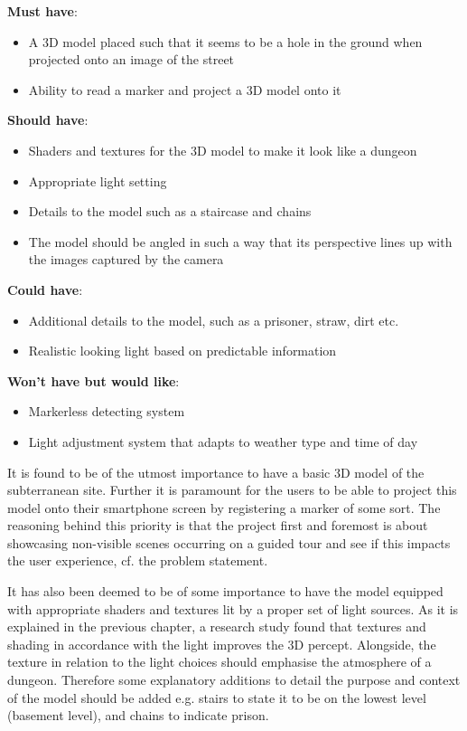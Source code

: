 \textbf{Must have}:
\begin{itemize}
\item A 3D model placed such that it seems to be a hole in the ground when projected onto an image of the street
\item Ability to read a marker and project a 3D model onto it
\end{itemize}

\textbf{Should have}:
\begin{itemize}
\item Shaders and textures for the 3D model to make it look like a dungeon
\item Appropriate light setting
\item Details to the model such as a staircase and chains
\item The model should be angled in such a way that its perspective lines up with the images captured by the camera
\end{itemize}

\textbf{Could have}:
\begin{itemize}
\item Additional details to the model, such as a prisoner, straw, dirt etc.
\item Realistic looking light based on predictable information
\end{itemize}

\textbf{Won’t have but would like}:
\begin{itemize}
\item Markerless detecting system
\item Light adjustment system that adapts to weather type and time of day
\end{itemize}

It is found to be of the utmost importance to have a basic 3D model of the subterranean site. Further it is paramount for the users to be able to project this model onto their smartphone screen by registering a marker of some sort. The reasoning behind this priority is that the project first and foremost is about showcasing non-visible scenes occurring on a guided tour and see if this impacts the user experience, cf. the problem statement. 

It has also been deemed to be of some importance to have the model equipped with appropriate shaders and textures lit by a proper set of light sources. As it is explained in the previous chapter, a research study found that textures and shading in accordance with the light improves the 3D percept. Alongside, the texture in relation to the light choices should emphasise the atmosphere of a dungeon. Therefore some explanatory additions to detail the purpose and context of the model should be added e.g. stairs to state it to be on the lowest level (basement level), and chains to indicate prison. 

